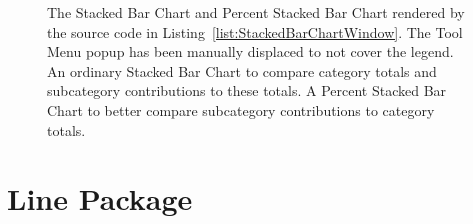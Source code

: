 \begin{figure}[tp]
\centering
{}
\hspace{1cm}
\caption[Stacked Bar Chart Window Example]{%
The Stacked Bar Chart and Percent Stacked Bar Chart rendered by the source
code in Listing~\ref{list:StackedBarChartWindow}. The Tool Menu popup has
been manually displaced to not cover the legend.
 An ordinary Stacked Bar Chart to
compare category totals and subcategory contributions to these totals.
 A Percent Stacked Bar Chart to
better compare subcategory contributions to category totals.
}
\label{fig:StackedBarChartWindow}
\end{figure}
  




\section{Line Package}

